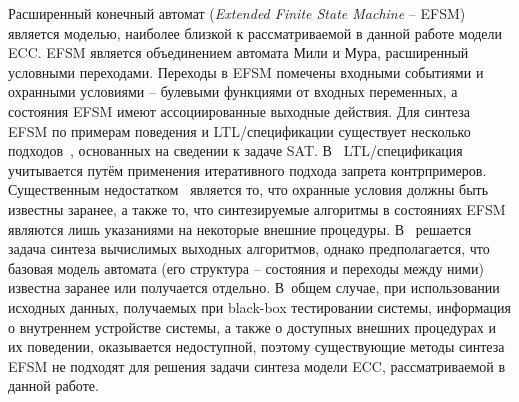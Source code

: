 Расширенный конечный автомат (\textit{Extended Finite State Machine} \--- EFSM) является моделью, наиболее близкой к рассматриваемой в данной работе модели ECC\@. EFSM является объединением автомата Мили и Мура, расширенный условными переходами.
Переходы в EFSM помечены входными событиями и охранными условиями \--- булевыми функциями от входных переменных, а состояния EFSM имеют ассоциированные выходные действия.
Для синтеза EFSM по примерам поведения и LTL\-/спецификации существует несколько подходов~\cite{efsm-tools,walkinshaw}, основанных на сведении к задаче SAT.
В~\cite{efsm-tools} LTL\-/спецификация учитывается путём применения итеративного подхода запрета контрпримеров.
Существенным недостатком~\cite{efsm-tools} является то, что охранные условия должны быть известны заранее, а также то, что синтезируемые алгоритмы в состояниях EFSM являются лишь указаниями на некоторые внешние процедуры.
В~\cite{walkinshaw} решается задача синтеза вычислимых выходных алгоритмов, однако предполагается, что базовая модель автомата (его структура \--- состояния и переходы между ними) известна заранее или получается отдельно.
В~общем случае, при использовании исходных данных, получаемых при black-box тестировании системы, информация о внутреннем устройстве системы, а также о доступных внешних процедурах и их поведении, оказывается недоступной, поэтому существующие методы синтеза EFSM не подходят для решения задачи синтеза модели ECC, рассматриваемой в данной работе.

